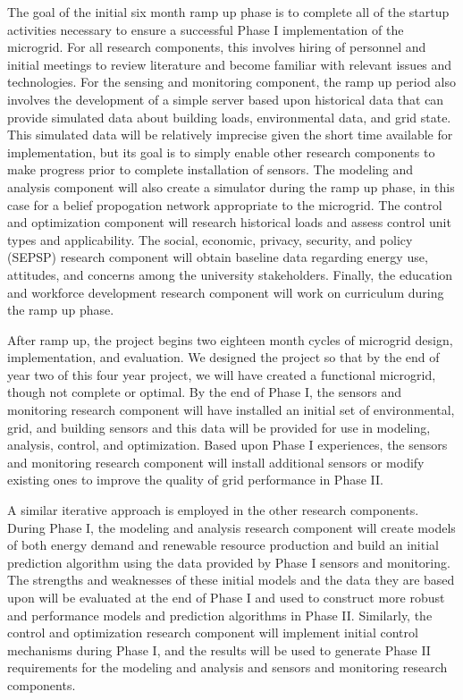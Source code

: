 The goal of the initial six month ramp up phase is to complete all of the
startup activities necessary to ensure a successful Phase I implementation
of the microgrid.  For all research components, this involves hiring of
personnel and initial meetings to review literature and become familiar
with relevant issues and technologies. For the sensing and monitoring
component, the ramp up period also involves the development of a simple
server based upon historical data that can provide simulated data about
building loads, environmental data, and grid state.  This simulated data
will be relatively imprecise given the short time available for
implementation, but its goal is to simply enable other research components
to make progress prior to complete installation of sensors.  The modeling
and analysis component will also create a simulator during the ramp up
phase, in this case for a belief propogation network appropriate to the
microgrid. The control and optimization component will research historical
loads and assess control unit types and applicability.   The social,
economic, privacy, security, and policy (SEPSP) research component will
obtain baseline data regarding energy use, attitudes, and concerns
among the university stakeholders. Finally, the education and workforce
development research component will work on curriculum during the ramp up
phase. 

After ramp up, the project begins two eighteen month cycles of microgrid
design, implementation, and evaluation.   We designed the project
so that by the end of year two of this four year project, we will have
created a functional microgrid, though not complete or optimal. 
By the end of Phase I, the sensors and monitoring research component will
have installed an initial set of environmental, grid, and building
sensors and this data will be provided for use in modeling, analysis,
control, and optimization.  Based upon Phase I experiences, the sensors and
monitoring research component will install additional sensors or modify
existing ones to improve the quality of grid performance in Phase II.

A similar iterative approach is employed in the other research
components. During Phase I, the modeling and analysis research component
will create models of both energy demand and renewable resource production
and build an initial prediction algorithm using the data provided by Phase
I sensors and monitoring.  The strengths and weaknesses of these initial
models and the data they are based upon will be evaluated at the end of
Phase I and used to construct more robust and performance models and
prediction algorithms in Phase II.  Similarly, the control and optimization
research component will implement initial control mechanisms during Phase
I, and the results will be used to generate Phase II requirements for the
modeling and analysis and sensors and monitoring research components.   

